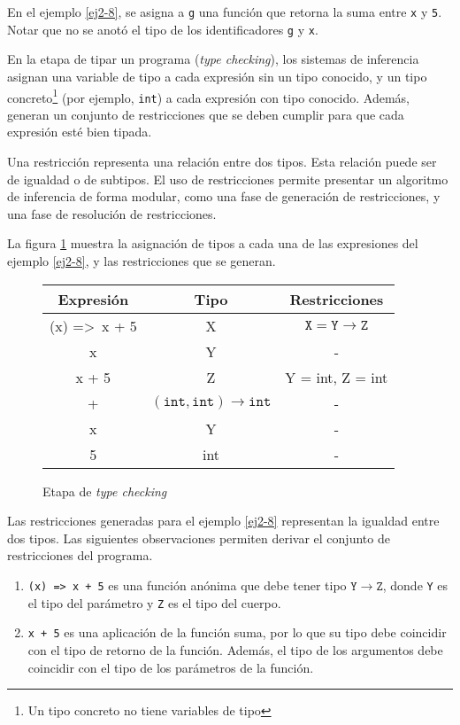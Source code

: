 En el ejemplo \ref{ej2-8}, se asigna a \texttt{g} una función que retorna la suma entre \texttt{x} y \texttt{5}. Notar que no se anotó el tipo de los identificadores \texttt{g} y \texttt{x}.

En la etapa de tipar un programa (\emph{type checking}), los sistemas de inferencia asignan una variable de tipo a cada expresión sin un tipo conocido, y un tipo concreto\footnote{Un tipo concreto no tiene variables de tipo} (por ejemplo, \texttt{int}) a cada expresión con tipo conocido. Además, generan un conjunto de restricciones que se deben cumplir para que cada expresión esté bien tipada.

Una restricción representa una relación entre dos tipos. Esta relación puede ser de igualdad o de subtipos. El uso de restricciones permite presentar un algoritmo de inferencia de forma modular, como una fase de generación de restricciones, y una fase de resolución de restricciones.

La figura \ref{tabla1} muestra la asignación de tipos a cada una de las expresiones del ejemplo \ref{ej2-8}, y las restricciones que se generan.


\begin{figure}[ht]
  \centering
  \ttfamily
  \begin{tabular}{c c c}
    Expresión & Tipo & Restricciones\\
    \hline
    (x) =>\ x + 5 & X & $\mathtt{X = Y \rightarrow Z}$\\
    x & Y & -\\
    x + 5 & Z & Y = int, Z = int\\
    + & $\mathtt{(int,int) \rightarrow int}$ & -\\
    x & Y & -\\
    5 & int & -\\
  \end{tabular}
  \caption{Etapa de \emph{type checking}}
  \label{tabla1}
\end{figure}

Las restricciones generadas para el ejemplo \ref{ej2-8} representan la igualdad entre dos tipos. Las siguientes observaciones permiten derivar el conjunto de restricciones del programa.

\begin{enumerate}
  \item \texttt{(x) =>\ x + 5} es una función anónima que debe tener tipo $\mathtt{Y \rightarrow Z}$, donde \texttt{Y} es el tipo del parámetro y \texttt{Z} es el tipo del cuerpo.
  \item \texttt{x + 5} es una aplicación de la función suma, por lo que su tipo debe coincidir con el tipo de retorno de la función. Además, el tipo de los argumentos debe coincidir con el tipo de los parámetros de la función.
\end{enumerate}


